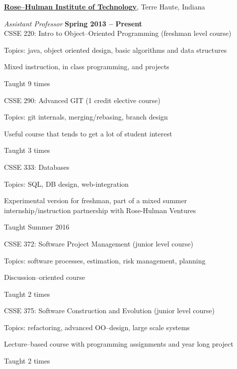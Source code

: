 \documentclass[10pt]{article}
\newenvironment{outerlist}[1][\enskip\textbullet]%
        {\begin{itemize}[#1]}{\end{itemize}%
         \vspace{-.6\baselineskip}}
\newenvironment{innerlist}[1][\enskip\textbullet]%
        {\begin{compactitem}[#1]}{\end{compactitem}}
\begin{document}
\href{http://www.rose-hulman.edu}{\textbf{Rose--Hulman Institute of Technology}},
Terre Haute, Indiana
\begin{outerlist}
\item[] \textit{Assistant Professor}%
    \hfill \textbf{Spring 2013 -- Present}\\

    CSSE 220: Intro to Object--Oriented Programming (freshman level course)
    \begin{innerlist}
    \item Topics: java, object oriented design, basic algorithms and data structures
    \item Mixed instruction, in class programming, and projects
    \item Taught 9 times %
    \end{innerlist}

    CSSE 290: Advanced GIT (1 credit elective course)
    \begin{innerlist}
    \item Topics: git internals, merging/rebasing, branch design
    \item Useful course that tends to get a lot of student interest
    \item Taught 3 times %
    \end{innerlist}

    CSSE 333: Databases 
    \begin{innerlist}
    \item Topics: SQL, DB design, web-integration
    \item Experimental version for freshman, part of a mixed summer internship/instruction partnership with Rose-Hulman Ventures
    \item Taught Summer 2016
    \end{innerlist}

    CSSE 372: Software Project Management (junior level course)
    \begin{innerlist}
    \item Topics: software processes, estimation, risk management, planning
    \item Discussion--oriented course
    \item Taught 2 times %
    \end{innerlist}

    CSSE 375: Software Construction and Evolution (junior level course)
    \begin{innerlist}
    \item Topics: refactoring, advanced OO--design, large scale systems
    \item Lecture--based course with programming assignments and year long project
    \item Taught 2 times
    \end{innerlist}


\end{outerlist}
\end{document}
